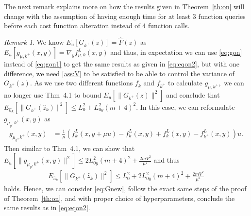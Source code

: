 \documentclass{article}
\theoremstyle{plain}
\theoremstyle{definition}
\theoremstyle{remark}
\newtheorem{remark}[theorem]{Remark}
\begin{document}
 The next remark explains more on how the results given in Theorem~\ref{th:on} will change with the assumption of having enough time for at least 3 function queries before each cost function alteration instead of 4 function calls.

\begin{remark}\label{rem:4to3}
    We know $E_{u}[G_{k^+}(z)] = \hat{F}(z)$ as $E_u[g_{\mu,k^+}(x,y)]=\nabla_y f^L_{\mu,k}(x,y)$ and thus, in expectation we can use \eqref{eq:gon} instead of \eqref{eq:gon1} to get the same results as given in \eqref{eq:eqon2}, but with one difference, we need \eqref{ass:V} to be satisfied to be able to control the variance of $G_{k^+}(z)$. As we use two different functions $f_k$ and $f_{k^+}$ to calculate $g_{\mu,k^+},$ we can no longer use \cite{nesterov_random_2017} Thm~4.1 to bound $E_u[\|G_{k^+}(z)\|^2]$ and conclude that $E_{\hat{u}_k}[\|G_{k^+}(\hat{z}_k)\|^2] \leq L_0^2 + L_{0y}^2(m+4)^2.$ In this case, we can reformulate $g_{\mu_y,k^+}(x,y)$ as 
    \begin{align}
         g_{\mu_y,k^+}(x,y) &= \tfrac{1}{\mu} (f^L_{k}(x,y+\mu u)-f^L_k(x,y) +f^L_k(x,y) -f^L_{k^+}(x,y)) u. \label{eq:gon2}
    \end{align}
    Then similar to \cite{nesterov_random_2017} Thm~4.1, we can show that 
    $E_u{[\| g_{\mu_y,k^+}(x,y)\|^2]}\leq 2L_{0y}^2(m+4)^2 + \frac{2mV^2}{\mu^2}$ and thus 
    \begin{align}\label{eq:Gnew}
        E_{\hat{u}_k}[\|G_{k^+}(\hat{z}_k)\|^2] \leq L_0^2 + 2L_{0y}^2(m+4)^2+\frac{2mV^2}{\mu^2}
    \end{align}
     holds. Hence, we can consider \eqref{eq:Gnew}, follow the exact same steps of the proof of Theorem~\ref{th:on}, and with proper choice of hyperparameters, conclude the same results as in \eqref{eq:eqon2}.
\end{remark}
\end{document}
